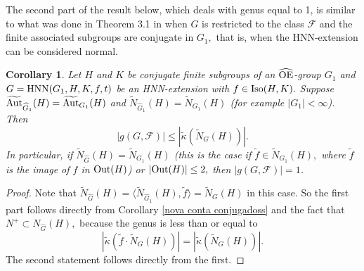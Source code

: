 \documentclass[a4paper,12pt]{article}
\newtheorem{cor}[thm]{Corollary}
\newcommand{\Oe}{\rm \widehat{OE}}
\def\aut {{\rm Aut}}
\def\out {{\rm Out}}
\def\hnn {{\rm HNN}}
\def\Iso {{\rm Iso}}
\newtheorem{exa}[thm]{Example}
\begin{document}
{%



The second part of the result below, which deals with genus equal to 1, is similar to what was done in Theorem 3.1 in \cite{BZ} when $G$ is restricted to the class $\mathcal{F}$ and the finite associated subgroups are conjugate in $G_1,$ that is, when the HNN-extension can be considered normal.


\begin{cor} \label{autG classe} 
Let $H$ and $K$ be conjugate finite subgroups of an $\Oe$-group $G_1$  and $G=\hnn(G_1, H, K, f, t)$ be an HNN-extension with $f \in \Iso(H, K).$ Suppose $\widetilde{\aut}_{\widehat G_1}(H)=\widetilde{\aut}_{G_1}(H)$ and $\widetilde{N}_{\widehat G_1}(H)=\widetilde{N}_{ G_1}(H)$ (for example $|G_1|<\infty$).  Then $$|g(G, \mathcal{F})| \leq | \tilde\kappa(\widetilde{N}_{G}(H))|.$$ In particular, if $\widetilde{N}_{\widehat G}(H)=\widetilde{N}_{G_1}(H)$ (this is the case if $\tilde f\in \widetilde{N}_{ G_1}(H),$ where $\tilde f$ is the image of $f$ in $\out(H)$) or $|\out(H)|\leq 2,$ then $|g(G, \mathcal{F})|=1$.
\end{cor}
\begin{proof} Note that $\widetilde N_{\widehat G}(H)=\langle \widetilde N_{\widehat G_1}(H), \tilde f\rangle=\widetilde N_G(H)$ in this case. So  the first part follows directly from Corollary \ref{nova conta conjugadoss} and the fact that $N^{+} \subset N_{\widehat G}(H),$ because the genus is less than or equal to $$| \tilde\kappa(\tilde f \cdot \widetilde{N}_{G}(H))|=| \tilde\kappa( \widetilde{N}_{G}(H))|.$$ The second statement follows directly from the first. 
\end{proof}

}
\end{document}
